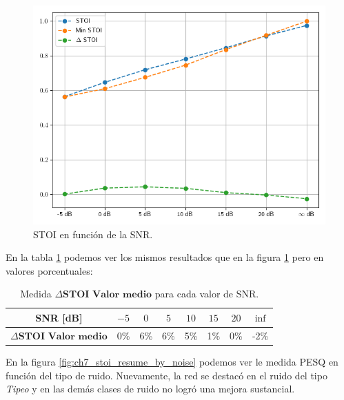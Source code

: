 \begin{figure}
	\centering
	\centerline{\includegraphics[scale=0.70]{images/ch7/objective_metrics/metric_STOI.png}}
	\caption{STOI en función de la SNR.}
	\label{fig:ch7_stoi_resume}
\end{figure}

En la tabla \ref{table:neural_filter_stoi_resume} podemos ver los mismos resultados que en la figura \ref{fig:ch7_stoi_resume} pero en valores porcentuales:

\begin{table}[ht]
	\centering
	\begin{tabular}{ |c|c|c|c|c|c|c|c| } 
		\hline
		SNR [dB] & $-5$ & $0$ & $5$ & $10$ & $15$ & $20$ & $\inf$ \\ 
		\hline
		$\Delta \textbf{STOI Valor medio}$ & 0\%  & 6\%  & 6\% & 5\% & 1\% & 0\% & -2\% \\
		\hline
	\end{tabular}
	\caption{Medida $\Delta \textbf{STOI Valor medio}$ para cada valor de SNR.}
	\label{table:neural_filter_stoi_resume}
\end{table}

En la figura \ref{fig:ch7_stoi_resume_by_noise} podemos ver le medida PESQ en función del tipo de ruido. Nuevamente, la red se destacó en el ruido del tipo \emph{Tipeo} y en las demás clases de ruido no logró una mejora sustancial.

